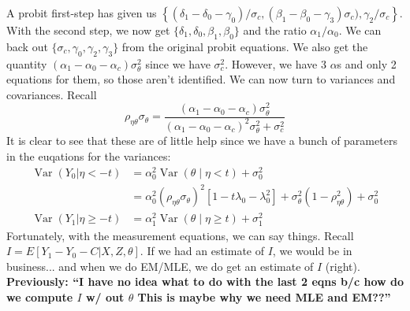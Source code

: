 \documentclass[11pt,letterpaper]{article}
\DeclareMathOperator{\Var}{Var}
\begin{document}
A probit first-step has given us $\left\{ (\delta_1 - \delta_0 -\gamma_0)/\sigma_c, (\beta_1 - \beta_0 - \gamma_3)\sigma_c), \gamma_2/\sigma_c \right\}$. With the second step, we now get $\{\delta_1, \delta_0, \beta_1, \beta_0\}$ and the ratio $\alpha_1/\alpha_0$. We can back out $\{\sigma_c, \gamma_0, \gamma_2, \gamma_3\}$ from the original probit equations. We also get the quantity $(\alpha_1 - \alpha_0 - \alpha_c)\sigma^2_\theta$ since we have $\sigma_c^2$. However, we have 3 $\alpha$s and only 2 equations for them, so those aren't identified. We can now turn to variances and covariances. Recall
\[
\rho_{\eta\theta}\sigma_\theta = \frac{(\alpha_1 - \alpha_0 - \alpha_c)\sigma^2_\theta}{(\alpha_1 - \alpha_0 - \alpha_c)^2\sigma^2_\theta + \sigma^2_c}
\]
It is clear to see that these are of little help since we have a bunch of parameters in the euqations for the variances: 
\begin{align*}
\Var (Y_0| \eta  <  -t ) 
	&= \alpha_0^2 \Var\left(\theta\middle| \eta <    t\right) + \sigma^2_0  \\
	&= \alpha_0^2 \left( \rho_{\eta\theta}\sigma_\theta \right)^2 \left[1 - t \lambda_0 - \lambda_0^2 \right] + \sigma^2_\theta \left( 1- \rho_{\eta\theta}^2\right) + \sigma^2_0\\
\Var (Y_1| \eta\geq -t ) &= \alpha_1^2 \Var\left(\theta\middle| \eta \geq t\right) + \sigma^2_1 
\end{align*}
Fortunately, with the measurement equations, we can say things. Recall $I=E[Y_1 - Y_0 - C|X,Z,\theta]$. If we had an estimate of $I$, we would be in business... and when we do EM/MLE, we do get an estimate of $I$ (right). \textbf{Previously: ``I have no idea what to do with the last 2 eqns b/c how do we compute $I$ w/ out $\theta$ This is maybe why we need MLE and EM??''}
\end{document}
